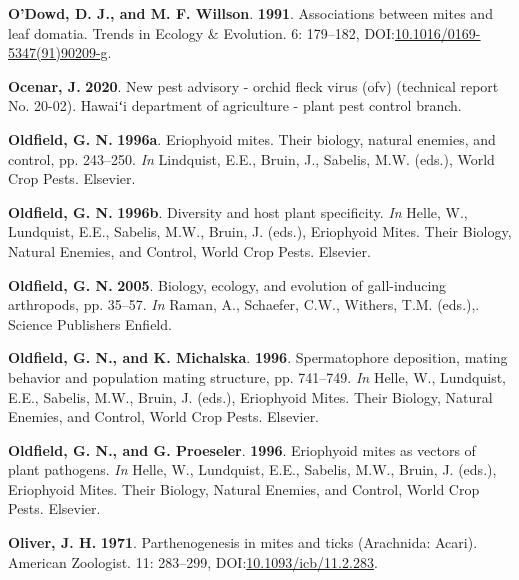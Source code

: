 \documentclass[12pt,final,CPage]{ufthesis}
\newlength{\cslhangindent}
\newenvironment{CSLReferences}[2] %
{%
	\setlength{\parindent}{0pt}
	\ifodd #1 \everypar{\setlength{\hangindent}{\cslhangindent}}\ignorespaces\fi
	\ifnum #2 > 0
	\setlength{\parskip}{#2\baselineskip}
	\fi
}%
{}
\begin{document}
{\begin{CSLReferences}{1}{0}
  \leavevmode{}%
  \textbf{O'Dowd, D. J., and M. F. Willson}. \textbf{1991}. Associations between mites and leaf domatia. Trends in Ecology {\&} Evolution. 6: 179--182, DOI:\href{https://doi.org/10.1016/0169-5347(91)90209-g}{10.1016/0169-5347(91)90209-g}.

  \leavevmode{}%
  \textbf{Ocenar, J.} \textbf{2020}. New pest advisory - orchid fleck virus (ofv) (technical report No. 20-02). Hawaiʻi department of agriculture - plant pest control branch.

  \leavevmode{}%
  \textbf{Oldfield, G. N.} \textbf{1996a}. Eriophyoid mites. Their biology, natural enemies, and control, pp. 243--250. \emph{In} Lindquist, E.E., Bruin, J., Sabelis, M.W. (eds.), World Crop Pests. Elsevier.

  \leavevmode{}%
  \textbf{Oldfield, G. N.} \textbf{1996b}. Diversity and host plant specificity. \emph{In} Helle, W., Lundquist, E.E., Sabelis, M.W., Bruin, J. (eds.), Eriophyoid Mites. Their Biology, Natural Enemies, and Control, World Crop Pests. Elsevier.

  \leavevmode{}%
  \textbf{Oldfield, G. N.} \textbf{2005}. Biology, ecology, and evolution of gall-inducing arthropods, pp. 35--57. \emph{In} Raman, A., Schaefer, C.W., Withers, T.M. (eds.),. Science Publishers Enfield.

  \leavevmode{}%
  \textbf{Oldfield, G. N., and K. Michalska}. \textbf{1996}. Spermatophore deposition, mating behavior and population mating structure, pp. 741--749. \emph{In} Helle, W., Lundquist, E.E., Sabelis, M.W., Bruin, J. (eds.), Eriophyoid Mites. Their Biology, Natural Enemies, and Control, World Crop Pests. Elsevier.

  \leavevmode{}%
  \textbf{Oldfield, G. N., and G. Proeseler}. \textbf{1996}. Eriophyoid mites as vectors of plant pathogens. \emph{In} Helle, W., Lundquist, E.E., Sabelis, M.W., Bruin, J. (eds.), Eriophyoid Mites. Their Biology, Natural Enemies, and Control, World Crop Pests. Elsevier.

  \leavevmode{}%
  \textbf{Oliver, J. H.} \textbf{1971}. Parthenogenesis in mites and ticks ({Arachnida}: {Acari}). American Zoologist. 11: 283--299, DOI:\href{https://doi.org/10.1093/icb/11.2.283}{10.1093/icb/11.2.283}.


\end{CSLReferences}}
\end{document}
